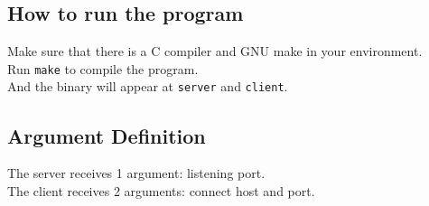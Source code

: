 \documentclass{article}
\begin{document}
\subsection{How to run the program}
Make sure that there is a C compiler and GNU make in your environment. \\
Run \texttt{make} to compile the program. \\
And the binary will appear at \texttt{server} and \texttt{client}.

\subsection{Argument Definition}
The server receives 1 argument: listening port. \\
The client receives 2 arguments: connect host and port.
\end{document}
